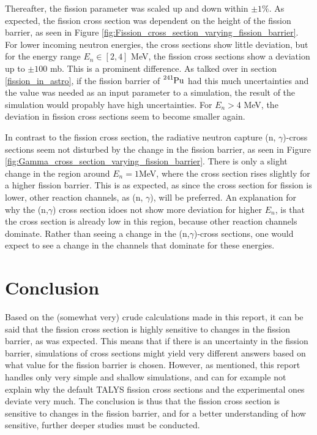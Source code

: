 \documentclass[]{article}
\begin{document}
 \par 
 \vspace{3mm}
 \noindent Thereafter, the fission parameter was scaled up and down within $\pm 1 \%$. As expected, the fission cross section was dependent on the height of the fission barrier, as seen in Figure \ref{fig:Fission_cross_section_varying_fission_barrier}. For lower incoming neutron energies, the cross sections show little deviation, but for the energy range $E_n \in [2,4]$ MeV, the fission cross sections show a deviation up to $\pm 100$ mb. This is a prominent difference. As talked over in section \ref{fission_in_astro}, if the fission barrier of $\ce{^{241}Pu}$ had this much uncertainties and the value was needed as an input parameter to a simulation, the result of the simulation would propably have high uncertainties. For $E_n > 4$ MeV, the deviation in fission cross sections seem to become smaller again.
 
 \par 
 \vspace{3mm}
 \noindent In contrast to the fission cross section, the radiative neutron capture (n, $\gamma$)-cross sections seem not disturbed by the change in the fission barrier, as seen in Figure \ref{fig:Gamma_cross_section_varying_fission_barrier}. There is only a slight change in the region around $E_n = 1$MeV, where the cross section rises slightly for a higher fission barrier. This is as expected, as since the cross section for fission is lower, other reaction channels, as (n, $\gamma$), will be preferred. An explanation for why the (n,$\gamma$) cross section idoes not show more deviation for higher $E_n$, is that the cross section is already low in this region, because other reaction channels dominate. Rather than seeing a change in the (n,$\gamma$)-cross sections, one would expect to see a change in the channels that dominate for these energies. 


\section{Conclusion}
Based on the (somewhat very) crude calculations made in this report, it can be said that the fission cross section is highly sensitive to changes in the fission barrier, as was expected. This means that if there is an uncertainty in the fission barrier, simulations of cross sections might yield very different answers based on what value for the fission barrier is chosen. However, as mentioned, this report handles only very simple and shallow simulations, and can for example not explain why the default TALYS fission cross sections and the experimental ones deviate very much. The conclusion is thus that the fission cross section is sensitive to changes in the fission barrier, and for a better understanding of how sensitive, further deeper studies must be conducted. 
\end{document}
